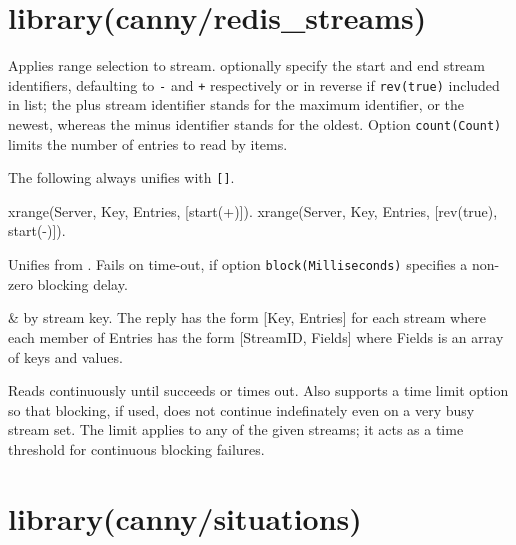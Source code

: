 \chapter{library(canny/redis_streams)}\label{sec:redisstreams}

\begin{description}
Applies range selection to  stream.  optionally specify
the start and end stream identifiers, defaulting to \verb$-$ and \verb$+$
respectively or in reverse if \verb$rev(true)$ included in  list;
the plus stream identifier stands for the maximum identifier, or
the newest, whereas the minus identifier stands for the oldest.
Option \verb$count(Count)$ limits the number of entries to read by
 items.

The following always unifies  with \verb$[]$.

\begin{code}
xrange(Server, Key, Entries, [start(+)]).
xrange(Server, Key, Entries, [rev(true), start(-)]).
\end{code}

Unifies  from . Fails on time-out, if option
\verb$block(Milliseconds)$ specifies a non-zero blocking delay.

\begin{arguments}
 & by stream key. The reply has the form [Key, Entries]
for each stream where each member of Entries has the form
[StreamID, Fields] where Fields is an array of keys and values. \\
\end{arguments}

\nodescription
Reads  continuously until  succeeds or times out. Also
supports a  time limit option so that blocking, if used, does
not continue indefinately even on a very busy stream set. The limit
applies to any of the given streams; it acts as a time threshold
for continuous blocking failures.
\end{description}

\chapter{library(canny/situations)}\label{sec:situations}

